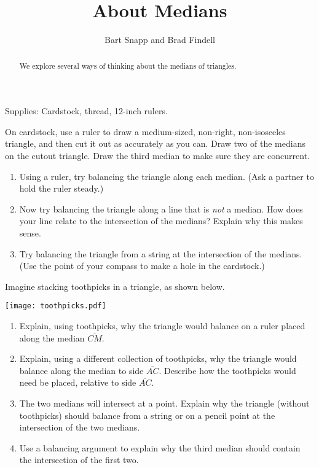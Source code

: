 \documentclass[nooutcomes]{ximera}
\title{About Medians}
\author{Bart Snapp and Brad Findell}
\begin{document}
\begin{abstract}
We explore several ways of thinking about the medians of triangles.  
\end{abstract}
\maketitle

\begin{teachingnote}
Supplies:  Cardstock, thread, 12-inch rulers.
\end{teachingnote}



\begin{problem}  
On cardstock, use a ruler to draw a medium-sized, non-right, non-isosceles triangle, and then cut it out as accurately as you can.  Draw two of the medians on the cutout triangle.  Draw the third median to make sure they are concurrent.  
\begin{enumerate}
\item Using a ruler, try balancing the triangle along each median.  (Ask a partner to hold the ruler steady.)  
\item Now try balancing the triangle along a line that is \emph{not} a median.  How does your line relate to the intersection of the medians?  Explain why this makes sense.  
\item Try balancing the triangle from a string at the intersection of the medians.  (Use the point of your compass to make a hole in the cardstock.)
\end{enumerate}

\end{problem}

\begin{problem}
Imagine stacking toothpicks in a triangle, as shown below.  

\begin{image}
\texttt{[image: toothpicks.pdf]}
\end{image}

\begin{enumerate}
\item Explain, using toothpicks, why the triangle would balance on a ruler placed along the median $\overline{CM}$.  
\item Explain, using a different collection of toothpicks, why the triangle would balance along the median to side $\overline{AC}$.  Describe how the toothpicks would need be placed, relative to side $\overline{AC}$.
\item The two medians will intersect at a point.  Explain why the triangle (without toothpicks) should balance from a string or on a pencil point at the intersection of the two medians.  
\item Use a balancing argument to explain why the third median should contain the intersection of the first two.  
\end{enumerate}
\end{problem}
\end{document}
